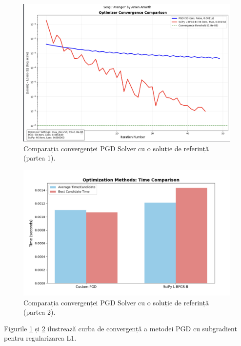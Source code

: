 \documentclass[12pt,a4paper]{article}
\begin{document}
\begin{figure}[htbp]
	\centering
	\includegraphics[width=1.0\textwidth]{Data4.png} %
	\caption{Comparația convergenței PGD Solver cu o soluție de referință (partea 1).}
	\label{fig:pgd_solver_comparison_1}
\end{figure}

\begin{figure}[htbp]
	\centering
	\includegraphics[width=1.0\textwidth]{Data5.png} %
	\caption{Comparația convergenței PGD Solver cu o soluție de referință (partea 2).}
	\label{fig:pgd_solver_comparison_2}
\end{figure}

Figurile \ref{fig:pgd_solver_comparison_1} și \ref{fig:pgd_solver_comparison_2} ilustrează curba de convergență a metodei PGD cu subgradient pentru regularizarea L1.  
\end{document}
